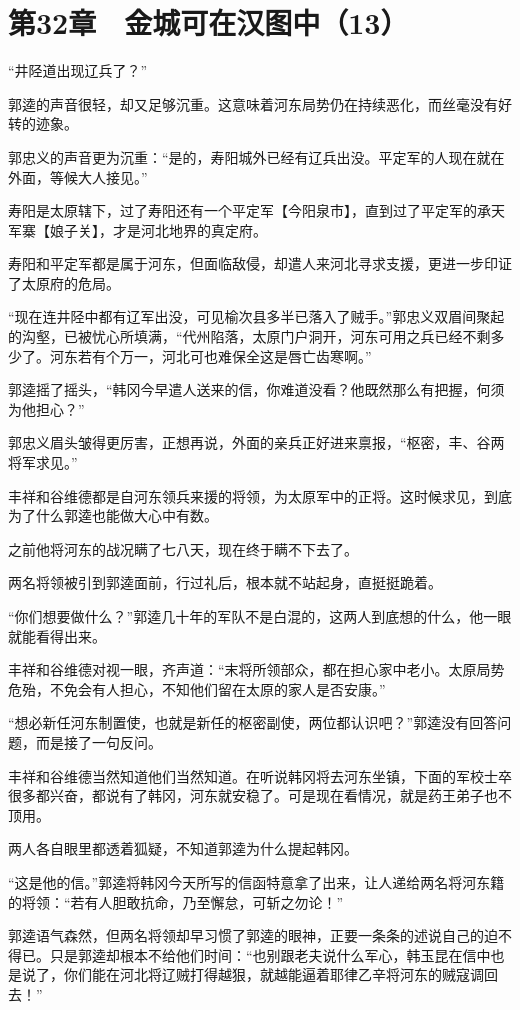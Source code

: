 \section{第32章　金城可在汉图中（13）}

“井陉道出现辽兵了？”

郭逵的声音很轻，却又足够沉重。这意味着河东局势仍在持续恶化，而丝毫没有好转的迹象。

郭忠义的声音更为沉重：“是的，寿阳城外已经有辽兵出没。平定军的人现在就在外面，等候大人接见。”

寿阳是太原辖下，过了寿阳还有一个平定军【今阳泉市】，直到过了平定军的承天军寨【娘子关】，才是河北地界的真定府。

寿阳和平定军都是属于河东，但面临敌侵，却遣人来河北寻求支援，更进一步印证了太原府的危局。

“现在连井陉中都有辽军出没，可见榆次县多半已落入了贼手。”郭忠义双眉间聚起的沟壑，已被忧心所填满，“代州陷落，太原门户洞开，河东可用之兵已经不剩多少了。河东若有个万一，河北可也难保全这是唇亡齿寒啊。”

郭逵摇了摇头，“韩冈今早遣人送来的信，你难道没看？他既然那么有把握，何须为他担心？”

郭忠义眉头皱得更厉害，正想再说，外面的亲兵正好进来禀报，“枢密，丰、谷两将军求见。”

丰祥和谷维德都是自河东领兵来援的将领，为太原军中的正将。这时候求见，到底为了什么郭逵也能做大心中有数。

之前他将河东的战况瞒了七八天，现在终于瞒不下去了。

两名将领被引到郭逵面前，行过礼后，根本就不站起身，直挺挺跪着。

“你们想要做什么？”郭逵几十年的军队不是白混的，这两人到底想的什么，他一眼就能看得出来。

丰祥和谷维德对视一眼，齐声道：“末将所领部众，都在担心家中老小。太原局势危殆，不免会有人担心，不知他们留在太原的家人是否安康。”

“想必新任河东制置使，也就是新任的枢密副使，两位都认识吧？”郭逵没有回答问题，而是接了一句反问。

丰祥和谷维德当然知道他们当然知道。在听说韩冈将去河东坐镇，下面的军校士卒很多都兴奋，都说有了韩冈，河东就安稳了。可是现在看情况，就是药王弟子也不顶用。

两人各自眼里都透着狐疑，不知道郭逵为什么提起韩冈。

“这是他的信。”郭逵将韩冈今天所写的信函特意拿了出来，让人递给两名将河东籍的将领：“若有人胆敢抗命，乃至懈怠，可斩之勿论！”

郭逵语气森然，但两名将领却早习惯了郭逵的眼神，正要一条条的述说自己的迫不得已。只是郭逵却根本不给他们时间：“也别跟老夫说什么军心，韩玉昆在信中也是说了，你们能在河北将辽贼打得越狠，就越能逼着耶律乙辛将河东的贼寇调回去！”

